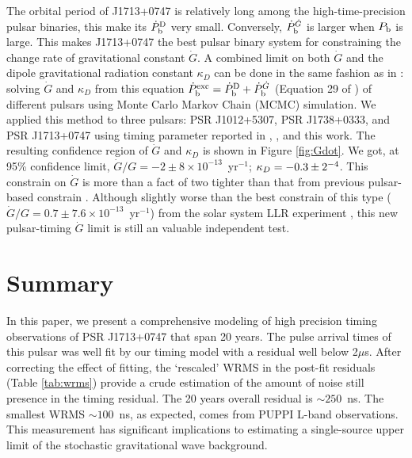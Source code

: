 The orbital period of J1713+0747 is relatively long among the
high-time-precision pulsar binaries, this make its $\dot{P}_{\rm b}^{\rm D}$
very small. Conversely, $\dot{P}_{\rm b}^{\dot{G}}$ is larger when $P_{\rm b}$
is large. This makes J1713+0747 the best pulsar binary system for constraining
the change rate of gravitational constant $\dot{G}$. A combined limit on both
$\dot{G}$ and the dipole gravitational radiation constant $\kappa_D$ can be
done in the same fashion as in \citet{lwj+09}: solving $\dot{G}$ and $\kappa_D$
from this equation $\dot{P}_{\rm b}^{\rm exc} = \dot{P}_{\rm b}^{\rm D} +
\dot{P}_{\rm b}^{\dot{G}}$ (Equation 29 of \citealt{lwj+09}) of different
pulsars using Monte Carlo Markov Chain (MCMC) simulation. We applied this method to three pulsars: PSR J1012+5307, PSR
J1738+0333, and PSR J1713+0747 using timing parameter reported in
\citet{lwj+09}, \citet{fwe+12}, and this work.
The resulting confidence region of $\dot{G}$ and $\kappa_D$ is shown in Figure
\ref{fig:Gdot}.
We got, at 95\% confidence limit, $\dot{G}/G = -2\pm8\times10^{-13}$~yr$^{-1}$;
$\kappa_D=-0.3\pm2\time10^{-4}$. 
This constrain on $\dot{G}$ is more than a fact of two tighter than that from
previous pulsar-based constrain \citep{fwe+12}. 
Although slightly worse than
the best constrain of this type
($\dot{G}/G=0.7\pm7.6\times10^{-13}$~yr$^{-1}$) from the solar system LLR
experiment \citep{hmb10}, this new pulsar-timing  $\dot{G}$ limit is still an valuable independent test.  



\section{Summary}
In this paper, we present a comprehensive modeling of high precision timing observations of
PSR J1713+0747 that span 20 years. 
The pulse arrival times of this pulsar was well fit by our timing model with a
residual well below 2$\mu$s.
After correcting the effect of fitting, the `rescaled' WRMS in the post-fit residuals (Table \ref{tab:wrms}) provide a crude estimation of
the amount of noise still presence in the timing residual. The 20 years
overall residual is $\sim 250$~ns. The smallest WRMS $\sim100$~ns, as expected,
comes from PUPPI L-band observations.
This measurement has significant implications to estimating a single-source
upper limit of the stochastic gravitational wave background.


